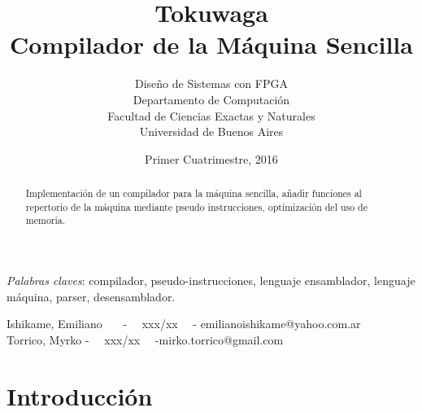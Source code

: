 \documentclass[12pt]{article}
\begin{document}

\title{Tokuwaga\\Compilador de la M\'aquina Sencilla}

\author{Dise\~no de Sistemas con FPGA\\
  Departamento de Computaci\'on\\
  Facultad de Ciencias Exactas y Naturales\\
  Universidad de Buenos Aires}

\date{Primer Cuatrimestre, 2016}          %

\renewcommand*\contentsname{\'Indice}


\singlespacing

\maketitle

\vspace{1in}
\begin{abstract}
\noindent Implementaci\'on de un compilador para la m\'aquina sencilla, a\~nadir funciones al repertorio de la m\'aquina mediante pseudo instrucciones, optimizaci\'on del uso de memoria.
\end{abstract}

\medskip
\noindent \textit{Palabras claves}: compilador, pseudo-instrucciones, lenguaje ensamblador, lenguaje m\'aquina, parser, desensamblador.

\vspace{2in}
\noindent 
Ishikame, Emiliano \ \ \ - \ \ xxx/xx \ \ - emilianoishikame@yahoo.com.ar\\
Torrico, Myrko - \ \ xxx/xx \ \ -mirko.torrico@gmail.com\\

\medskip

\thispagestyle{empty}

\clearpage

\tableofcontents

\clearpage

\setcounter{page}{1}

\section{Introducci\'on}
\end{document}
